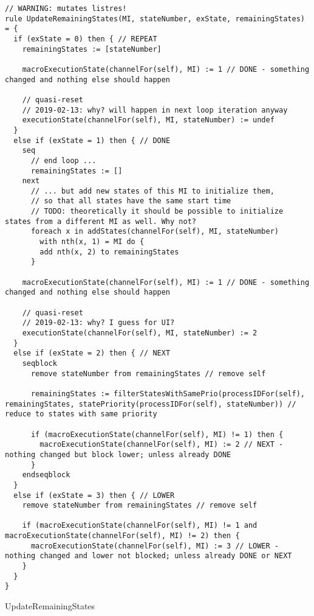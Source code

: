 \begin{listing}[H]
\begin{verbatim}
// WARNING: mutates listres!
rule UpdateRemainingStates(MI, stateNumber, exState, remainingStates) = {
  if (exState = 0) then { // REPEAT
    remainingStates := [stateNumber]

    macroExecutionState(channelFor(self), MI) := 1 // DONE - something changed and nothing else should happen

    // quasi-reset
    // 2019-02-13: why? will happen in next loop iteration anyway
    executionState(channelFor(self), MI, stateNumber) := undef
  }
  else if (exState = 1) then { // DONE
    seq
      // end loop ...
      remainingStates := []
    next
      // ... but add new states of this MI to initialize them,
      // so that all states have the same start time
      // TODO: theoretically it should be possible to initialize states from a different MI as well. Why not?
      foreach x in addStates(channelFor(self), MI, stateNumber)
        with nth(x, 1) = MI do {
        add nth(x, 2) to remainingStates
      }

    macroExecutionState(channelFor(self), MI) := 1 // DONE - something changed and nothing else should happen

    // quasi-reset
    // 2019-02-13: why? I guess for UI?
    executionState(channelFor(self), MI, stateNumber) := 2
  }
  else if (exState = 2) then { // NEXT
    seqblock
      remove stateNumber from remainingStates // remove self

      remainingStates := filterStatesWithSamePrio(processIDFor(self), remainingStates, statePriority(processIDFor(self), stateNumber)) // reduce to states with same priority

      if (macroExecutionState(channelFor(self), MI) != 1) then {
        macroExecutionState(channelFor(self), MI) := 2 // NEXT - nothing changed but block lower; unless already DONE
      }
    endseqblock
  }
  else if (exState = 3) then { // LOWER
    remove stateNumber from remainingStates // remove self

    if (macroExecutionState(channelFor(self), MI) != 1 and macroExecutionState(channelFor(self), MI) != 2) then {
      macroExecutionState(channelFor(self), MI) := 3 // LOWER - nothing changed and lower not blocked; unless already DONE or NEXT
    }
  }
}
\end{verbatim}
\caption{UpdateRemainingStates}
\label{lst:asm:UpdateRemainingStates}
\end{listing}




